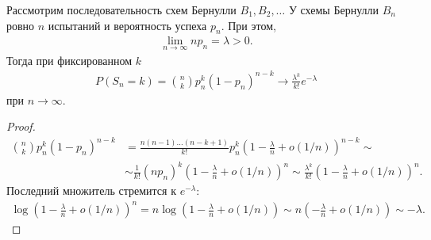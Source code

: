 \documentclass[../main.tex]{subfiles}
\begin{document}
\begin{thm}[%
 Пуассона]
 \label{theorem:poisson}
 Рассмотрим последовательность схем Бернулли $B_1, B_2, \ldots$ У схемы Бернулли $B_n$ ровно $n$ испытаний и вероятность успеха $p_n$. При этом,
 \begin{align*}
  \lim_{n \to \infty} np_n = \lambda > 0 
 .\end{align*} Тогда при фиксированном $k$
 \begin{align*}
  P(S_n = k) = \binom n k p_n^{k} (1-p_n)^{n-k} \to \frac{\lambda^{k}}{k!} e^{-\lambda}
 \end{align*} при $n \to \infty$.
\end{thm}
\begin{proof}
 \begin{align*}
  \binom n k p_n^{k}(1-p_n)^{n-k} &= \frac{n(n-1)\ldots(n-k+1)}{k!} p_n^{k} \left(1 - \frac{\lambda}{n} + o (1 / n)\right)^{n-k} \sim \\
  & \sim \frac{1}{k!}(np_n)^{k} \left( 1 - \frac{\lambda}{n} + o(1 / n) \right)^{n} \sim \frac{\lambda^{k}}{k!} \left( 1 - \frac{\lambda}{n} + o(1 / n) \right)^{n}
 .\end{align*}  Последний множитель стремится к $e^{-\lambda}$:
 \begin{align*}
  \log \left( 1 - \frac{\lambda}{n} + o(1 / n) \right)^{n} = n \log \left( 1 - \frac{\lambda}{n} + o(1 / n) \right) \sim n \left( - \frac{\lambda}{n} + o(1 / n) \right) \sim -\lambda
 .\end{align*} 
\end{proof}
\end{document}

